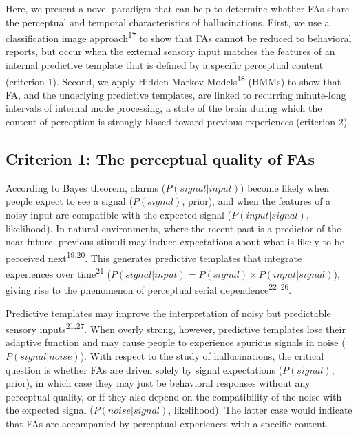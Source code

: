 \documentclass[
]{article}
\begin{document}
Here, we present a novel paradigm that can help to determine whether FAs
share the perceptual and temporal characteristics of hallucinations.
First, we use a classification image approach\textsuperscript{17} to
show that FAs cannot be reduced to behavioral reports, but occur when
the external sensory input matches the features of an internal
predictive template that is defined by a specific perceptual content
(criterion 1). Second, we apply Hidden Markov Models\textsuperscript{18}
(HMMs) to show that FA, and the underlying predictive templates, are
linked to recurring minute-long intervals of internal mode processing, a
state of the brain during which the content of perception is strongly
biased toward previous experiences (criterion 2).

\hypertarget{criterion-1-the-perceptual-quality-of-fas}{%
\subsection{Criterion 1: The perceptual quality of
FAs}\label{criterion-1-the-perceptual-quality-of-fas}}

According to Bayes theorem, alarms (\(P(signal|input)\)) become likely
when people expect to see a signal (\(P(signal)\), prior), and when the
features of a noisy input are compatible with the expected signal
(\(P(input|signal)\), likelihood). In natural environments, where the
recent past is a predictor of the near future, previous stimuli may
induce expectations about what is likely to be perceived
next\textsuperscript{19,20}. This generates predictive templates that
integrate experiences over time\textsuperscript{21}
(\(P(signal|input) = P(signal) \times P(input|signal)\)), giving rise to
the phenomenon of perceptual serial dependence\textsuperscript{22--26}.

Predictive templates may improve the interpretation of noisy but
predictable sensory inputs\textsuperscript{21,27}. When overly strong,
however, predictive templates lose their adaptive function and may cause
people to experience spurious signals in noise (\(P(signal|noise)\)).
With respect to the study of hallucinations, the critical question is
whether FAs are driven solely by signal expectations (\(P(signal)\),
prior), in which case they may just be behavioral responses without any
perceptual quality, or if they also depend on the compatibility of the
noise with the expected signal (\(P(noise|signal)\), likelihood). The
latter case would indicate that FAs are accompanied by perceptual
experiences with a specific content.
\end{document}
